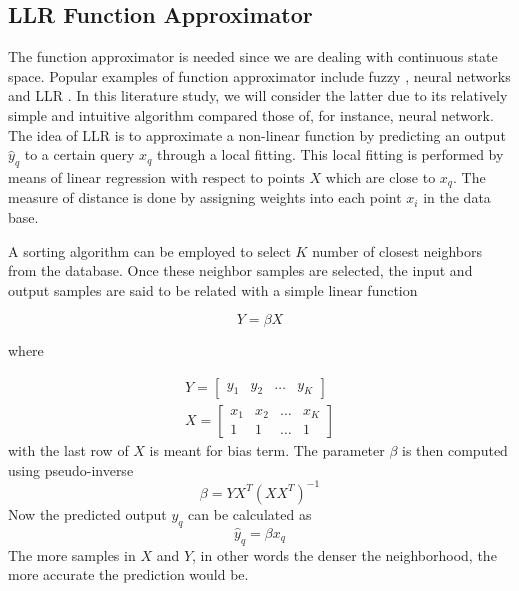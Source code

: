 \subsection{\acs{LLR} Function Approximator}
The function approximator is needed since we are dealing with continuous state space. Popular examples of function approximator include fuzzy \cite{Efe2014}, neural networks \cite{Kiumarsi6918527} and \acs {LLR} \cite{Grondman6096441}. In this literature study, we will consider the latter due to its relatively simple and intuitive algorithm compared those of, for instance, neural network. The idea of \acs {LLR} is to approximate a non-linear function by predicting an output $\hat{y}_q$ to a certain query $x_q$ through a local fitting. This local fitting is performed by means of linear regression with respect to points $X$ which are close to $x_q$.  
The measure of distance is done by assigning weights into each point $x_i$ in the data base. 

A sorting algorithm can be employed to select $K$ number of closest neighbors from the database. Once these neighbor samples are selected, the input and output samples are said to be related with a simple linear function

\begin{equation}
Y = \beta X
\end{equation}

where 

\begin{equation}
\begin{split}
Y = \left[ \begin{array}{cccc}
y_1 & y_2 & \dots & y_K
\end{array} \right] \\
X = \left[ \begin{array}{cccc}
x_1 & x_2 & \dots & x_K \\ 
1 & 1 & \dots & 1
\end{array}  \right] 
\end{split}
\end{equation}
with the last row of $X$ is meant for bias term. The parameter $\beta$ is then computed using pseudo-inverse
\begin{equation}
\beta = YX^T(XX^T)^{-1}
\end{equation}
Now the predicted output $y_q$ can be calculated as
\begin{equation}
\hat{y}_q = \beta x_q
\end{equation}
The more samples in $X$ and $Y$, in other words the denser the neighborhood, the more accurate the prediction would be.





